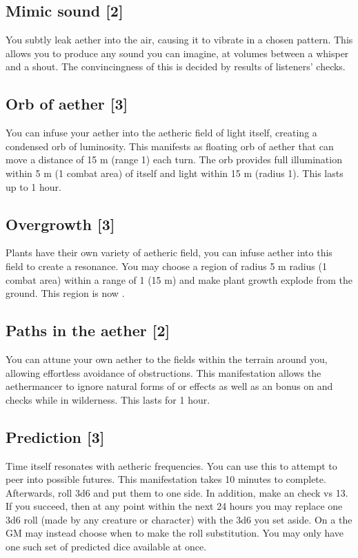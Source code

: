 \subsection{Mimic sound [2]}
You subtly leak aether into the air, causing it to vibrate in a chosen pattern. This allows you to produce any sound you can imagine, at volumes between a whisper and a shout. The convincingness of this is decided by results of listeners'  checks.


\subsection{Orb of aether [3]}
\label{spell:orb-light}
You can infuse your aether into the aetheric field of light itself, creating a condensed orb of luminosity. This manifests as floating orb of aether that can move a distance of 15 m (range 1) each turn. The orb provides full illumination within 5 m (1 combat area) of itself and  light within 15 m (radius 1). This lasts up to 1 hour.


\subsection{Overgrowth [3]}
\label{spell:overgrowth}
Plants have their own variety of aetheric field, you can infuse aether into this field to create a resonance. You may choose a region of radius 5 m radius (1 combat area) within a range of 1 (15 m) and make plant growth explode from the ground. This region is now .


\subsection{Paths in the aether [2]}
You can attune your own aether to the fields within the terrain around you, allowing effortless avoidance of obstructions. This manifestation allows the aethermancer to ignore natural forms of  or  effects as well as an  bonus on  and  checks while in wilderness. This lasts for 1 hour.


\subsection{Prediction [3]}
Time itself resonates with aetheric frequencies. You can use this to attempt to peer into possible futures. This manifestation takes 10 minutes to complete. Afterwards, roll 3d6 and put them to one side. In addition, make an  check vs  13. If you succeed, then at any point within the next 24 hours you may replace one 3d6 roll (made by any creature or character) with the 3d6 you set aside. On a  the GM may instead choose when to make the roll substitution. You may only have one such set of predicted dice available at once.
